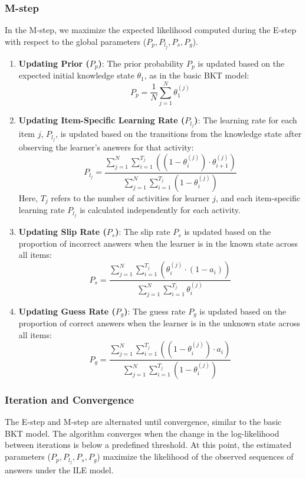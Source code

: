 \documentclass{article}
\begin{document}
\subsubsection{M-step}
In the M-step, we maximize the expected likelihood computed during the E-step with respect to the global parameters (\(P_p, P_{l_j}, P_s, P_g\)).

\begin{enumerate}
    \item \textbf{Updating Prior (\(P_p\))}:
    The prior probability \(P_p\) is updated based on the expected initial knowledge state \(\theta_1\), as in the basic BKT model:
    \[
    P_p = \frac{1}{N} \sum_{j=1}^N \theta_1^{(j)}
    \]

    \item \textbf{Updating Item-Specific Learning Rate (\(P_{l_j}\))}:
    The learning rate for each item \(j\), \(P_{l_j}\), is updated based on the transitions from the knowledge state after observing the learner's answers for that activity:
    \[
    P_{l_j} = \frac{\sum_{j=1}^N \sum_{i=1}^{T_j} \left( (1 - \theta_i^{(j)}) \cdot \theta_{i+1}^{(j)} \right)}{\sum_{j=1}^N \sum_{i=1}^{T_j} (1 - \theta_i^{(j)})}
    \]
    Here, \(T_j\) refers to the number of activities for learner \(j\), and each item-specific learning rate \(P_{l_j}\) is calculated independently for each activity.

    \item \textbf{Updating Slip Rate (\(P_s\))}:
    The slip rate \(P_s\) is updated based on the proportion of incorrect answers when the learner is in the known state across all items:
    \[
    P_s = \frac{\sum_{j=1}^N \sum_{i=1}^{T_j} \left( \theta_i^{(j)} \cdot (1 - a_i) \right)}{\sum_{j=1}^N \sum_{i=1}^{T_j} \theta_i^{(j)}}
    \]

    \item \textbf{Updating Guess Rate (\(P_g\))}:
    The guess rate \(P_g\) is updated based on the proportion of correct answers when the learner is in the unknown state across all items:
    \[
    P_g = \frac{\sum_{j=1}^N \sum_{i=1}^{T_j} \left( (1 - \theta_i^{(j)}) \cdot a_i \right)}{\sum_{j=1}^N \sum_{i=1}^{T_j} (1 - \theta_i^{(j)})}
    \]
\end{enumerate}

\subsubsection{Iteration and Convergence}
The E-step and M-step are alternated until convergence, similar to the basic BKT model. The algorithm converges when the change in the log-likelihood between iterations is below a predefined threshold. At this point, the estimated parameters (\(P_p, P_{l_j}, P_s, P_g\)) maximize the likelihood of the observed sequences of answers under the ILE model.
\end{document}
